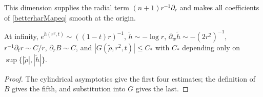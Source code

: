 \begin{remark}
\label{rem:choice-of-dimension-n-plus-2}
This dimension supplies the radial term $(n+1)r^{-1}\partial_r$ and
makes all coefficients of \eqref{betterharMapeq} smooth at the origin.
\end{remark}

\begin{claim}
\label{claim:harmonic-map-flow-asymptotics}
\label{asympt}

At infinity, $e^{\tilde h(r^2,t)}\sim((1-t)r)^{-1}$,
$\tilde h\sim-\log r$, $\partial_w\tilde h\sim-(2r^2)^{-1}$,
$r^{-1}\partial_tr\sim C/r$, $\partial_rB\sim C$, and
$|G(\tilde\rho,r^2,t)|\le C_*$ with $C_*$ depending only on
$\sup\{|\tilde\rho|,|\tilde h|\}$.
\end{claim}
\begin{proof}
\sketch The cylindrical asymptotics give the first four estimates; the
definition of $B$ gives the fifth, and substitution into $G$ gives the last.
\end{proof}

